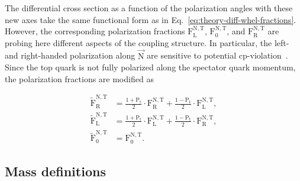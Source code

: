 
The differential cross section as a function of the polarization angles with these new axes take the same functional form as in Eq.~\ref{eq:theory-diff-whel-fractions}. However, the corresponding polarization fractions $\mathrm{F}_\mathrm{L}^\mathrm{N,T}$, $\mathrm{F}_\mathrm{0}^\mathrm{N,T}$, and $\mathrm{F}_\mathrm{R}^\mathrm{N,T}$ are probing here different aspects of the coupling structure. In particular, the left- and right-handed polarization along $\vec{\mathrm{N}}$ are sensitive to potential \gls{cp}-violation~\cite{AguilarSaavedra:2010nx}. Since the top quark is not fully polarized along the spectator quark momentum, the  polarization fractions are modified as

\begin{align}
\tilde{\mathrm{F}}_\mathrm{R}^\mathrm{N,T}&=\frac{1+\mathrm{P}_\mathrm{t}}{2}\cdot\mathrm{F}_\mathrm{R}^\mathrm{N,T}+\frac{1-\mathrm{P}_\mathrm{t}}{2}\cdot\mathrm{F}_\mathrm{L}^\mathrm{N,T}, \\
\tilde{\mathrm{F}}_\mathrm{L}^\mathrm{N,T}&=\frac{1+\mathrm{P}_\mathrm{t}}{2}\cdot\mathrm{F}_\mathrm{L}^\mathrm{N,T}+\frac{1-\mathrm{P}_\mathrm{t}}{2}\cdot\mathrm{F}_\mathrm{R}^\mathrm{N,T}, \\
\tilde{\mathrm{F}}_\mathrm{0}^\mathrm{N,T}&=\mathrm{F}_\mathrm{0}^\mathrm{N,T}.
\end{align}



\subsection{Mass definitions}

